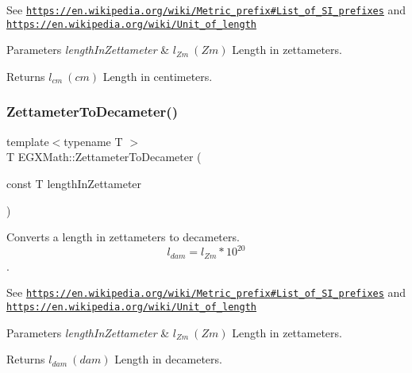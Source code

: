 See \href{https://en.wikipedia.org/wiki/Metric_prefix#List_of_SI_prefixes}{\tt https\+://en.\+wikipedia.\+org/wiki/\+Metric\+\_\+prefix\#\+List\+\_\+of\+\_\+\+S\+I\+\_\+prefixes} and \href{https://en.wikipedia.org/wiki/Unit_of_length}{\tt https\+://en.\+wikipedia.\+org/wiki/\+Unit\+\_\+of\+\_\+length} 
\begin{DoxyParams}{Parameters}
{\em length\+In\+Zettameter} & $ l_{Zm}\ (Zm)$ Length in zettameters. \\
\hline
\end{DoxyParams}
\begin{DoxyReturn}{Returns}
$ l_{cm}\ (cm)$ Length in centimeters. 
\end{DoxyReturn}
\mbox{\label{group___e_g_x_math-_conversions-_length_conversions-_s_i-_zettameter-_s_i_ga3346f705d6a1e23f103456886cfca420}} 
\subsubsection{\texorpdfstring{Zettameter\+To\+Decameter()}{ZettameterToDecameter()}}
{\footnotesize\ttfamily template$<$typename T $>$ \\
T E\+G\+X\+Math\+::\+Zettameter\+To\+Decameter (\begin{DoxyParamCaption}\item[{const T}]{length\+In\+Zettameter }\end{DoxyParamCaption})}



Converts a length in zettameters to decameters. \[ l_{dam}=l_{Zm} * 10^{20} \]. 

See \href{https://en.wikipedia.org/wiki/Metric_prefix#List_of_SI_prefixes}{\tt https\+://en.\+wikipedia.\+org/wiki/\+Metric\+\_\+prefix\#\+List\+\_\+of\+\_\+\+S\+I\+\_\+prefixes} and \href{https://en.wikipedia.org/wiki/Unit_of_length}{\tt https\+://en.\+wikipedia.\+org/wiki/\+Unit\+\_\+of\+\_\+length} 
\begin{DoxyParams}{Parameters}
{\em length\+In\+Zettameter} & $ l_{Zm}\ (Zm)$ Length in zettameters. \\
\hline
\end{DoxyParams}
\begin{DoxyReturn}{Returns}
$ l_{dam}\ (dam)$ Length in decameters. 
\end{DoxyReturn}
\mbox{\label{group___e_g_x_math-_conversions-_length_conversions-_s_i-_zettameter-_s_i_gadee88d17dc42d5a94ff2bbb0dfe05a71}} 
